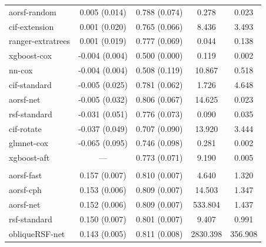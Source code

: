 \documentclass{article}\usepackage[]{graphicx}\usepackage[]{xcolor}
\newenvironment{knitrout}{}{} %
\begin{document}
\begin{knitrout}
\begin{longtable}[t]{lcccc}
\hspace{1em}aorsf-random & 0.005 (0.014) & 0.788 (0.074) & 0.278 & 0.023\\
\hspace{1em}cif-extension & 0.001 (0.020) & 0.765 (0.066) & 8.436 & 3.493\\
\hspace{1em}ranger-extratrees & 0.001 (0.019) & 0.777 (0.069) & 0.044 & 0.138\\
\hspace{1em}xgboost-cox & -0.004 (0.004) & 0.500 (0.000) & 0.119 & 0.002\\
\hspace{1em}nn-cox & -0.004 (0.004) & 0.508 (0.119) & 10.867 & 0.518\\
\hspace{1em}cif-standard & -0.005 (0.025) & 0.781 (0.062) & 1.726 & 4.648\\
\hspace{1em}aorsf-net & -0.005 (0.032) & 0.806 (0.067) & 14.625 & 0.023\\
\hspace{1em}rsf-standard & -0.031 (0.051) & 0.776 (0.073) & 0.090 & 0.035\\
\hspace{1em}cif-rotate & -0.037 (0.049) & 0.707 (0.090) & 13.920 & 3.444\\
\hspace{1em}glmnet-cox & -0.065 (0.095) & 0.746 (0.098) & 0.281 & 0.002\\
\hspace{1em}xgboost-aft & --- & 0.773 (0.071) & 9.190 & 0.005\\
\addlinespace[0.3em]
\multicolumn{5}{l}{\textit{\textbf{ARIC; coronary heart disease, n = 13623, p = 41}}}\\
\hline
\hspace{1em}aorsf-fast & 0.157 (0.007) & 0.810 (0.007) & 4.640 & 1.320\\
\hspace{1em}aorsf-cph & 0.153 (0.006) & 0.809 (0.007) & 14.503 & 1.347\\
\hspace{1em}aorsf-net & 0.152 (0.006) & 0.809 (0.007) & 533.804 & 1.437\\
\hspace{1em}rsf-standard & 0.150 (0.007) & 0.801 (0.007) & 9.407 & 0.991\\
\hspace{1em}obliqueRSF-net & 0.143 (0.005) & 0.811 (0.008) & 2830.398 & 356.908\\

\end{longtable}
\end{knitrout}
\end{document}
